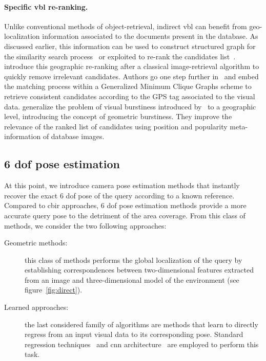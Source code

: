 \paragraph{Specific \ac{vbl} re-ranking.}
Unlike conventional methods of object-retrieval, indirect \ac{vbl} can benefit from geo-localization information associated to the documents present in the database. As discussed earlier, this information can be used to construct structured graph for the similarity search process~\citep{Torii2011,Cao2013} or exploited to re-rank the candidates list~\citep{Zamir2010,Zamir2014,Sattler2016}. \citet{Zamir2010} introduce this geographic re-ranking after a classical image-retrieval algorithm to quickly remove irrelevant candidates. Authors go one step further in~\citep{Zamir2014} and embed the matching process within a Generalized Minimum Clique Graphs scheme to retrieve consistent candidates according to the GPS tag associated to the visual data. \citet{Sattler2016} generalize the problem of visual burstiness introduced by~\citep{Jegou2009} to a geographic level, introducing the concept of geometric burstiness. They improve the relevance of the ranked list of candidates using position and popularity meta-information of database images.

\subsection{6 \acs*{dof} pose estimation}
\label{subsec:fine_pose_estimation}

At this point, we introduce camera pose estimation methods that instantly recover the exact 6 \ac{dof} pose of the query according to a known reference. Compared to \ac{cbir} approaches, 6 \ac{dof} pose estimation methods provide a more accurate query pose to the detriment of the area coverage. From this class of methods, we consider the two following approaches:
\begin{description}
	\item[Geometric methods:] this class of methods performs the global localization of the query by establishing correspondences between two-dimensional features extracted from an image and three-dimensional model of the environment (see figure~\ref{fig:direct}).
	\item[Learned approaches:] the last considered family of algorithms are methods that learn to directly regress from an input visual data to its corresponding pose. Standard regression techniques~\citep{Shotton2013} and \ac{cnn} architecture~\citep{Kendall2015} are employed to perform this task.
\end{description}


